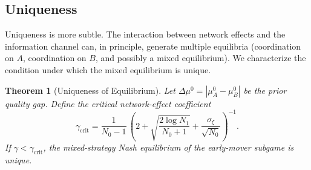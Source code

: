 \documentclass[12pt,a4paper]{article}
\newtheorem{theorem}{Theorem}[section]
\begin{document}
\subsection{Uniqueness}

Uniqueness is more subtle.  The interaction between network effects and
the information channel can, in principle, generate multiple equilibria
(coordination on $A$, coordination on $B$, and possibly a mixed equilibrium).
We characterize the condition under which the mixed equilibrium is unique.

\begin{theorem}[Uniqueness of Equilibrium]
\label{thm:uniqueness}
Let $\Delta\mu^0 = |\mu_A^0-\mu_B^0|$ be the prior quality gap.
Define the \emph{critical network-effect coefficient}
\begin{equation}\label{eq:gamma-crit}
    \gamma_{\text{crit}} =
    \frac{1}{N_0-1}\,
    \left(
        2
        + \sqrt{\frac{2\log N_1}{N_0+1}}
        + \frac{\sigma_\xi}{\sqrt{N_0}}
    \right)^{-1}.
\end{equation}
If $\gamma < \gamma_{\text{crit}}$, the mixed-strategy Nash equilibrium of
the early-mover subgame is unique.
\end{theorem}
\end{document}
